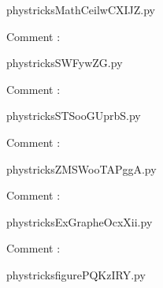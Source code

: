     \newcommand{\CaptionFigMathCeilwCXIJZ}{<+Type your caption here+>}
    \begin{center}
        
    \end{center}
    phystricksMathCeilwCXIJZ.py

    Comment : 

    \clearpage
    


    \newcommand{\CaptionFigSWFywZG}{<+Type your caption here+>}
    \begin{center}
        
    \end{center}
    phystricksSWFywZG.py

    Comment : 

    \clearpage
    


    \newcommand{\CaptionFigSTSooGUprbS}{<+Type your caption here+>}
    \begin{center}
        
    \end{center}
    phystricksSTSooGUprbS.py

    Comment : 

    \clearpage
    


    \newcommand{\CaptionFigZMSWooTAPggA}{<+Type your caption here+>}
    \begin{center}
        
    \end{center}
    phystricksZMSWooTAPggA.py

    Comment : 

    \clearpage
    


    \newcommand{\CaptionFigExGrapheOcxXii}{<+Type your caption here+>}
    \begin{center}
        
    \end{center}
    phystricksExGrapheOcxXii.py

    Comment : 

    \clearpage
    


    \newcommand{\CaptionFigfigurePQKzIRY}{<+Type your caption here+>}
    \begin{center}
        
    \end{center}
    phystricksfigurePQKzIRY.py

